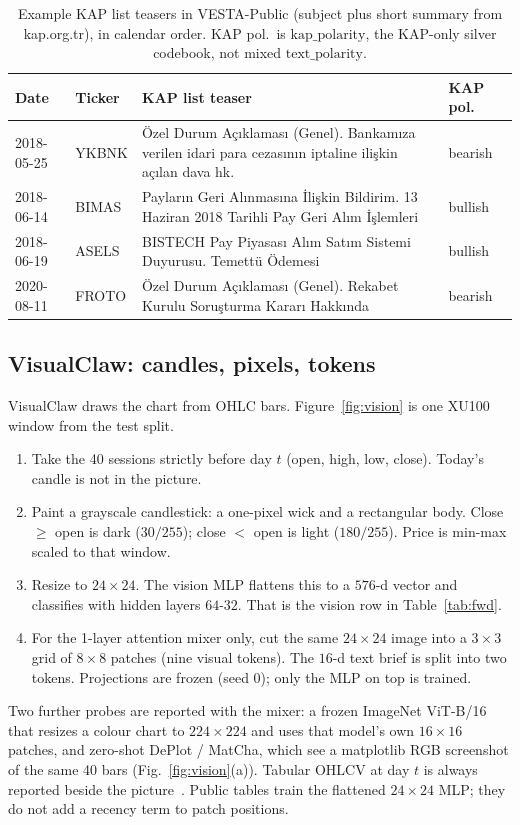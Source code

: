 \documentclass{llncs}
\begin{document}
\begin{table}[t]
\caption{Example KAP list teasers in VESTA-Public (subject plus short summary from kap.org.tr), in calendar order. KAP pol.\ is $\mathrm{kap\_polarity}$, the KAP-only silver codebook, not mixed $\mathrm{text\_polarity}$.}
\label{tab:text}
\centering
\footnotesize
\begin{tabular}{@{}ll>{\raggedright\arraybackslash}p{6.1cm}l@{}}
\toprule
Date & Ticker & KAP list teaser & KAP pol.\ \\
\midrule
2018-05-25 & YKBNK & Özel Durum Açıklaması (Genel). Bankamıza verilen idari para cezasının iptaline ilişkin açılan dava hk. & bearish \\
2018-06-14 & BIMAS & Payların Geri Alınmasına İlişkin Bildirim. 13 Haziran 2018 Tarihli Pay Geri Alım İşlemleri & bullish \\
2018-06-19 & ASELS & BISTECH Pay Piyasası Alım Satım Sistemi Duyurusu. Temettü Ödemesi & bullish \\
2020-08-11 & FROTO & Özel Durum Açıklaması (Genel). Rekabet Kurulu Soruşturma Kararı Hakkında & bearish \\
\bottomrule
\end{tabular}
\end{table}

\subsection{VisualClaw: candles, pixels, tokens}
\label{sec:vision}
VisualClaw draws the chart from OHLC bars. Figure~\ref{fig:vision} is one XU100 window from the test split.
\begin{enumerate}
\item Take the 40 sessions strictly before day $t$ (open, high, low, close). Today's candle is not in the picture.
\item Paint a grayscale candlestick: a one-pixel wick and a rectangular body. Close $\ge$ open is dark ($30/255$); close $<$ open is light ($180/255$). Price is min-max scaled to that window.
\item Resize to $24\times24$. The vision MLP flattens this to a $576$-d vector and classifies with hidden layers $64$-$32$. That is the vision row in Table~\ref{tab:fwd}.
\item For the 1-layer attention mixer only, cut the same $24\times24$ image into a $3\times3$ grid of $8\times8$ patches (nine visual tokens). The $16$-d text brief is split into two tokens. Projections are frozen (seed 0); only the MLP on top is trained.
\end{enumerate}
Two further probes are reported with the mixer: a frozen ImageNet ViT-B/16~\cite{dosovitskiy2021vit} that resizes a colour chart to $224\times224$ and uses that model's own $16\times16$ patches, and zero-shot DePlot / MatCha, which see a matplotlib RGB screenshot of the same 40 bars (Fig.~\ref{fig:vision}(a)). Tabular OHLCV at day $t$ is always reported beside the picture~\cite{jiang2023reimagining}. Public tables train the flattened $24\times24$ MLP; they do not add a recency term to patch positions.
\end{document}
